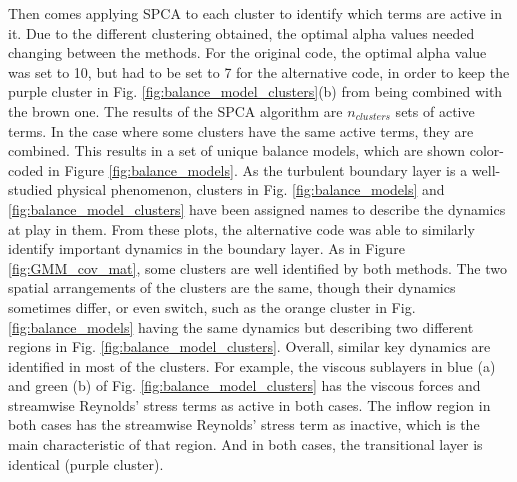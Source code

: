 \documentclass[12pt]{report} %
\begin{document}
\newpage

Then comes applying SPCA to each cluster to identify which terms are active in it. Due to the different clustering obtained, the optimal alpha values needed changing between the methods. For the original code, the optimal alpha value was set to 10, but had to be set to 7 for the alternative code, in order to keep the purple cluster in Fig. \ref{fig:balance_model_clusters}(b) from being combined with the brown one. The results of the SPCA algorithm are $n_{clusters}$ sets of active terms. In the case where some clusters have the same active terms, they are combined. This results in a set of unique balance models, which are shown color-coded in Figure \ref{fig:balance_models}. As the turbulent boundary layer is a well-studied physical phenomenon, clusters in Fig. \ref{fig:balance_models} and \ref{fig:balance_model_clusters} have been assigned names to describe the dynamics at play in them. From these plots, the alternative code was able to similarly identify important dynamics in the boundary layer. As in Figure \ref{fig:GMM_cov_mat}, some clusters are well identified by both methods. The two spatial arrangements of the clusters are the same, though their dynamics sometimes differ, or even switch, such as the orange cluster in Fig. \ref{fig:balance_models} having the same dynamics but describing two different regions in Fig. \ref{fig:balance_model_clusters}. Overall, similar key dynamics are identified in most of the clusters. For example, the viscous sublayers in blue (a) and green (b) of Fig. \ref{fig:balance_model_clusters} has the viscous forces and streamwise Reynolds’ stress terms as active in both cases. The inflow region in both cases has the streamwise Reynolds’ stress term as inactive, which is the main characteristic of that region. And in both cases, the transitional layer is identical (purple cluster).
\end{document}
